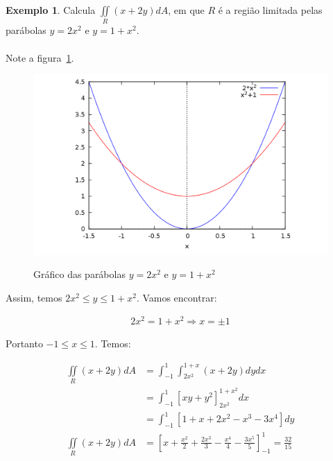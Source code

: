 \documentclass{article}
\newcommand{\doubleint}[1] {\iint\limits_R #1 dA}
\theoremstyle{definition}
\newtheorem{example}{Exemplo}[section]
\begin{document}
        \begin{example}
            Calcula $\doubleint{(x + 2y)}$, em que $R$ é a região limitada pelas parábolas
            $y = 2x^2$ e $y = 1 + x^2$.

            \paragraph{}
            Note a figura~\ref{graph:parabolas}.

            \begin{figure}[h!]
                \includegraphics[width=\linewidth]{parabolas.png}
                \label{graph:parabolas}
                \caption{Gráfico das parábolas $y = 2x^2$ e $y = 1 + x^2$}
            \end{figure}

            Assim, temos $2x^2 \leq y \leq 1 + x^2$. Vamos encontrar:

            \begin{align*}
                2x^2 = 1 + x^2 \Rightarrow x = \pm 1
            \end{align*}

            Portanto $-1 \leq x \leq 1$. Temos:

            \begin{align*}
                \doubleint{(x + 2y)} &= \int_{-1}^1 \int_{2x^2}^{1 + x} (x + 2y) dy dx\\
                &= \int_{-1}^1 \left[ xy + y^2 \right]_{2x^2}^{1 + x^2} dx\\
                &= \int_{-1}^1 \left[ 1 + x + 2x^2 - x^3 - 3x^4 \right] dy\\
                \doubleint{(x + 2y)} &= \left[ x + \frac{x^2}{2} + \frac{2x^3}{3} - \frac{x^4}{4} - \frac{3x^5}{5} \right]_{-1}^1 = \frac{32}{15}
            \end{align*}
        \end{example}
\end{document}

